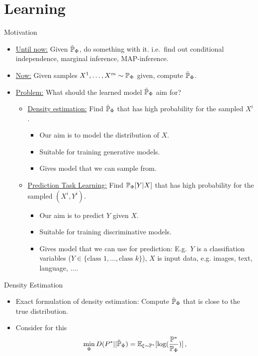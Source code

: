\section{Learning}

\begin{frame}{Motivation}
\begin{itemize}
    \item \underline{Until now:} Given $\tilde{\Pb}_\Phi$, do something with it. i.e.\ find out conditional independence, marginal inference, MAP-inference.
    \pause \item \underline{Now:} Given samples $X^1, \ldots, X^m \sim \Pb_{\Phi}$ given, compute $\tilde{\Pb}_\Phi$.
    \pause \item \underline{Problem:} What should the learned model $\tilde{\Pb}_\Phi$ aim for?
    \begin{itemize}
        \pause \item \underline{Density estimation:} Find $\tilde{\Pb}_\Phi$ that has high probability for the sampled $X^i$. 
        \begin{itemize}
            \pause \item Our aim is to model the distribution of $X$.
            \pause \item Suitable for training generative models. 
            \pause \item Gives model that we can sample from.
        \end{itemize}
        \pause \item \underline{Prediction Task Learning:} Find $\Pb_{\Phi}[Y | X]$ that has high probability for the sampled $(X^i,Y^i)$.
        \begin{itemize}
            \pause \item Our aim is to predict $Y$ given $X$.
            \pause \item Suitable for training discriminative models.
            \pause \item Gives model that we can use for prediction: E.g.\ $Y$ is a classifiation variables ($Y \in \{\text{class } 1, \ldots, \text{class } k\}$), $X$ is input data, e.g. images, text, language, $\ldots$.
        \end{itemize}
    \end{itemize}
\end{itemize}
\end{frame}

\begin{frame}{Density Estimation}
\begin{itemize}
    \item Exact formulation of density estimation: Compute $\tilde{\Pb}_\Phi$ that is close to the true distribution.
    \item Consider for this
    \begin{equation}
        \min_{\Phi} D(P^* || \tilde{\Pb}_\Phi) = \E_{\xi \sim \Pb^*}[\log(\frac{\Pb^*}{\Pb_{\Phi}})]\,,
    \end{equation}
\end{itemize}

\end{frame}